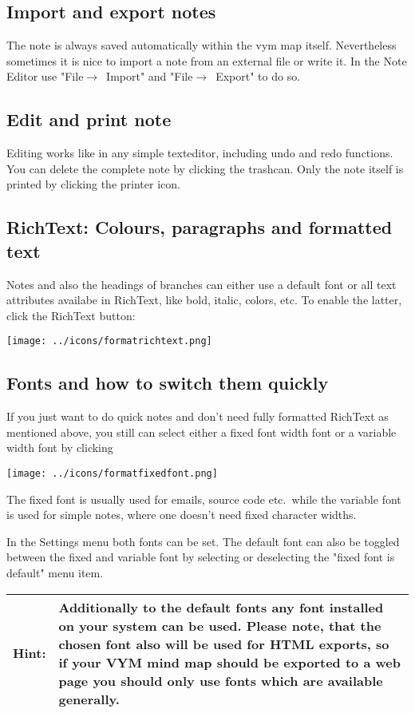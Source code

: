 \documentclass[12pt,a4paper]{article}
\newcommand{\hint}[1]{
    \begin{center} 
        \begin{tabular}{|rp{12cm}|} \hline
            {\bf Hint}:& #1\\   \hline
        \end{tabular}
            \marginpar{\Huge !} 
    \end{center} 
}
\newcommand{\vym}{{\sc vym }}
\newcommand{\ra}{$\longrightarrow$}
\begin{document}
\subsection{Import and export notes}
The note is always saved automatically within the \vym map itself.
Nevertheless sometimes it is nice to import a note from an external file
or write it. In the Note Editor use "File\ra~Import" and
"File\ra~Export" to do so. 

\subsection{Edit and print note}
Editing works like in any simple texteditor, including undo and redo
functions. You can delete the complete note by clicking the trashcan.
Only the note itself is printed by clicking the printer icon.

\subsection{RichText: Colours, paragraphs and formatted text}
Notes and also the headings of branches can either use a default font or
all text attributes availabe in RichText, like bold, italic, colors,
etc. To enable the latter, click the RichText button:
\begin{center}
    \texttt{[image: ../icons/formatrichtext.png]}
\end{center}

\subsection{Fonts and how to switch them quickly}
If you just want to do quick notes and don't need fully formatted
RichText as mentioned above, you still can select either a fixed font
width font or a variable width font by clicking
\begin{center}
    \texttt{[image: ../icons/formatfixedfont.png]}
\end{center}


The fixed font is usually used for emails, source code etc.\ while the
variable font is used for simple notes, where one doesn't need fixed
character widths.  

In the Settings menu both fonts can be set. The default font can also be
toggled between the fixed and variable font by selecting or deselecting
the "fixed font is default" menu item.

\hint{Additionally to the default fonts any font installed on your system can
be used. Please note, that the chosen font also will be used for HTML
exports, so if your VYM mind map should  be exported to a web page
you should only use fonts which are available generally.}
\end{document}
